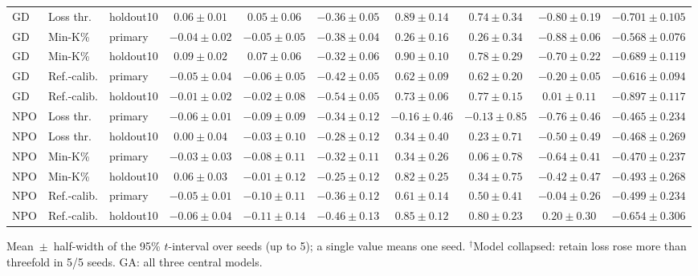 {\begin{longtable}{@{\extracolsep{\fill}}lllccccccc@{}}
GD & Loss thr. & holdout10 & $0.06 \pm 0.01$ & $0.05 \pm 0.06$ & $-0.36 \pm 0.05$ & $0.89 \pm 0.14$ & $0.74 \pm 0.34$ & $-0.80 \pm 0.19$ & $-0.701 \pm 0.105$ \\
GD & Min-K\% & primary & $-0.04 \pm 0.02$ & $-0.05 \pm 0.05$ & $-0.38 \pm 0.04$ & $0.26 \pm 0.16$ & $0.26 \pm 0.34$ & $-0.88 \pm 0.06$ & $-0.568 \pm 0.076$ \\
GD & Min-K\% & holdout10 & $0.09 \pm 0.02$ & $0.07 \pm 0.06$ & $-0.32 \pm 0.06$ & $0.90 \pm 0.10$ & $0.78 \pm 0.29$ & $-0.70 \pm 0.22$ & $-0.689 \pm 0.119$ \\
GD & Ref.-calib. & primary & $-0.05 \pm 0.04$ & $-0.06 \pm 0.05$ & $-0.42 \pm 0.05$ & $0.62 \pm 0.09$ & $0.62 \pm 0.20$ & $-0.20 \pm 0.05$ & $-0.616 \pm 0.094$ \\
GD & Ref.-calib. & holdout10 & $-0.01 \pm 0.02$ & $-0.02 \pm 0.08$ & $-0.54 \pm 0.05$ & $0.73 \pm 0.06$ & $0.77 \pm 0.15$ & $0.01 \pm 0.11$ & $-0.897 \pm 0.117$ \\
NPO & Loss thr. & primary & $-0.06 \pm 0.01$ & $-0.09 \pm 0.09$ & $-0.34 \pm 0.12$ & $-0.16 \pm 0.46$ & $-0.13 \pm 0.85$ & $-0.76 \pm 0.46$ & $-0.465 \pm 0.234$ \\
NPO & Loss thr. & holdout10 & $0.00 \pm 0.04$ & $-0.03 \pm 0.10$ & $-0.28 \pm 0.12$ & $0.34 \pm 0.40$ & $0.23 \pm 0.71$ & $-0.50 \pm 0.49$ & $-0.468 \pm 0.269$ \\
NPO & Min-K\% & primary & $-0.03 \pm 0.03$ & $-0.08 \pm 0.11$ & $-0.32 \pm 0.11$ & $0.34 \pm 0.26$ & $0.06 \pm 0.78$ & $-0.64 \pm 0.41$ & $-0.470 \pm 0.237$ \\
NPO & Min-K\% & holdout10 & $0.06 \pm 0.03$ & $-0.01 \pm 0.12$ & $-0.25 \pm 0.12$ & $0.82 \pm 0.25$ & $0.34 \pm 0.75$ & $-0.42 \pm 0.47$ & $-0.493 \pm 0.268$ \\
NPO & Ref.-calib. & primary & $-0.05 \pm 0.01$ & $-0.10 \pm 0.11$ & $-0.36 \pm 0.12$ & $0.61 \pm 0.14$ & $0.50 \pm 0.41$ & $-0.04 \pm 0.26$ & $-0.499 \pm 0.234$ \\
NPO & Ref.-calib. & holdout10 & $-0.06 \pm 0.04$ & $-0.11 \pm 0.14$ & $-0.46 \pm 0.13$ & $0.85 \pm 0.12$ & $0.80 \pm 0.23$ & $0.20 \pm 0.30$ & $-0.654 \pm 0.306$ \\
\end{longtable}
Mean~$\pm$~half-width of the 95\% $t$-interval over seeds (up to 5); a single value means one seed. $^{\dagger}$Model collapsed: retain loss rose more than threefold in 5/5 seeds. GA: all three central models.\par
}
